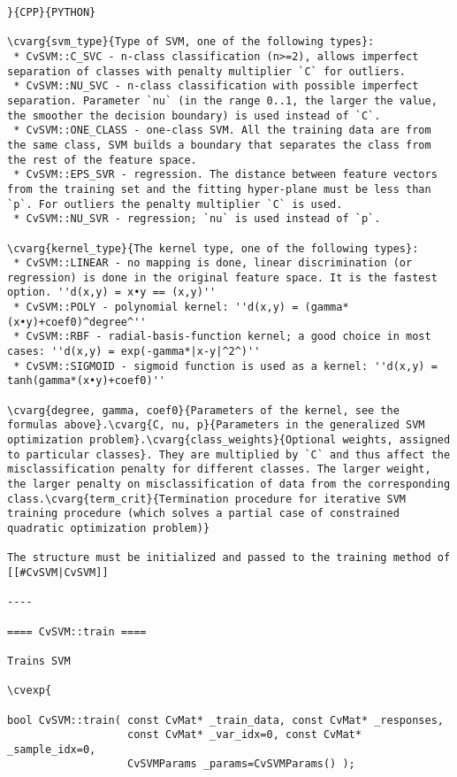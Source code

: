 \begin{verbatim}
}{CPP}{PYTHON}

\cvarg{svm_type}{Type of SVM, one of the following types}:
 * CvSVM::C_SVC - n-class classification (n>=2), allows imperfect separation of classes with penalty multiplier `C` for outliers.
 * CvSVM::NU_SVC - n-class classification with possible imperfect separation. Parameter `nu` (in the range 0..1, the larger the value, the smoother the decision boundary) is used instead of `C`.
 * CvSVM::ONE_CLASS - one-class SVM. All the training data are from the same class, SVM builds a boundary that separates the class from the rest of the feature space.
 * CvSVM::EPS_SVR - regression. The distance between feature vectors from the training set and the fitting hyper-plane must be less than `p`. For outliers the penalty multiplier `C` is used.
 * CvSVM::NU_SVR - regression; `nu` is used instead of `p`.

\cvarg{kernel_type}{The kernel type, one of the following types}:
 * CvSVM::LINEAR - no mapping is done, linear discrimination (or regression) is done in the original feature space. It is the fastest option. ''d(x,y) = x•y == (x,y)''
 * CvSVM::POLY - polynomial kernel: ''d(x,y) = (gamma*(x•y)+coef0)^degree^''
 * CvSVM::RBF - radial-basis-function kernel; a good choice in most cases: ''d(x,y) = exp(-gamma*|x-y|^2^)''
 * CvSVM::SIGMOID - sigmoid function is used as a kernel: ''d(x,y) = tanh(gamma*(x•y)+coef0)''

\cvarg{degree, gamma, coef0}{Parameters of the kernel, see the formulas above}.\cvarg{C, nu, p}{Parameters in the generalized SVM optimization problem}.\cvarg{class_weights}{Optional weights, assigned to particular classes}. They are multiplied by `C` and thus affect the misclassification penalty for different classes. The larger weight, the larger penalty on misclassification of data from the corresponding class.\cvarg{term_crit}{Termination procedure for iterative SVM training procedure (which solves a partial case of constrained quadratic optimization problem)}

The structure must be initialized and passed to the training method of [[#CvSVM|CvSVM]]

----

==== CvSVM::train ====

Trains SVM

\cvexp{

bool CvSVM::train( const CvMat* _train_data, const CvMat* _responses,
                   const CvMat* _var_idx=0, const CvMat* _sample_idx=0,
                   CvSVMParams _params=CvSVMParams() );


\end{verbatim}
